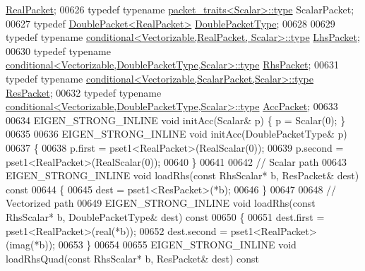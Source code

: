 \begin{DoxyCode}
      \hyperlink{group___sparse_core___module}{RealPacket};
00626   \textcolor{keyword}{typedef} \textcolor{keyword}{typename} \hyperlink{struct_eigen_1_1internal_1_1packet__traits}{packet\_traits<Scalar>::type}     ScalarPacket;
00627   \textcolor{keyword}{typedef} \hyperlink{struct_eigen_1_1internal_1_1_double_packet}{DoublePacket<RealPacket>} \hyperlink{struct_eigen_1_1internal_1_1_double_packet}{DoublePacketType};
00628 
00629   \textcolor{keyword}{typedef} \textcolor{keyword}{typename} \hyperlink{class_eigen_1_1internal_1_1_tensor_lazy_evaluator_writable}{conditional<Vectorizable,RealPacket,  Scalar>::type}
       \hyperlink{class_eigen_1_1internal_1_1_tensor_lazy_evaluator_writable}{LhsPacket};
00630   \textcolor{keyword}{typedef} \textcolor{keyword}{typename} \hyperlink{class_eigen_1_1internal_1_1_tensor_lazy_evaluator_writable}{conditional<Vectorizable,DoublePacketType,Scalar>::type}
       \hyperlink{class_eigen_1_1internal_1_1_tensor_lazy_evaluator_writable}{RhsPacket};
00631   \textcolor{keyword}{typedef} \textcolor{keyword}{typename} \hyperlink{class_eigen_1_1internal_1_1_tensor_lazy_evaluator_writable}{conditional<Vectorizable,ScalarPacket,Scalar>::type}
       \hyperlink{class_eigen_1_1internal_1_1_tensor_lazy_evaluator_writable}{ResPacket};
00632   \textcolor{keyword}{typedef} \textcolor{keyword}{typename} \hyperlink{class_eigen_1_1internal_1_1_tensor_lazy_evaluator_writable}{conditional<Vectorizable,DoublePacketType,Scalar>::type}
       \hyperlink{class_eigen_1_1internal_1_1_tensor_lazy_evaluator_writable}{AccPacket};
00633   
00634   EIGEN\_STRONG\_INLINE \textcolor{keywordtype}{void} initAcc(Scalar& p) \{ p = Scalar(0); \}
00635 
00636   EIGEN\_STRONG\_INLINE \textcolor{keywordtype}{void} initAcc(DoublePacketType& p)
00637   \{
00638     p.first   = pset1<RealPacket>(RealScalar(0));
00639     p.second  = pset1<RealPacket>(RealScalar(0));
00640   \}
00641 
00642   \textcolor{comment}{// Scalar path}
00643   EIGEN\_STRONG\_INLINE \textcolor{keywordtype}{void} loadRhs(\textcolor{keyword}{const} RhsScalar* b, ResPacket& dest)\textcolor{keyword}{ const}
00644 \textcolor{keyword}{  }\{
00645     dest = pset1<ResPacket>(*b);
00646   \}
00647 
00648   \textcolor{comment}{// Vectorized path}
00649   EIGEN\_STRONG\_INLINE \textcolor{keywordtype}{void} loadRhs(\textcolor{keyword}{const} RhsScalar* b, DoublePacketType& dest)\textcolor{keyword}{ const}
00650 \textcolor{keyword}{  }\{
00651     dest.first  = pset1<RealPacket>(real(*b));
00652     dest.second = pset1<RealPacket>(imag(*b));
00653   \}
00654   
00655   EIGEN\_STRONG\_INLINE \textcolor{keywordtype}{void} loadRhsQuad(\textcolor{keyword}{const} RhsScalar* b, ResPacket& dest)\textcolor{keyword}{ const}

\end{DoxyCode}
